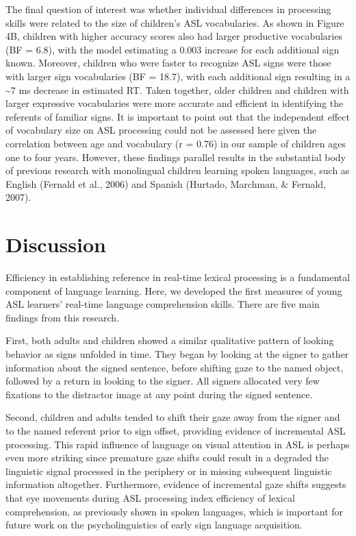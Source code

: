 \documentclass[oneside]{report}
\begin{document}
The final question of interest was whether individual differences in
processing skills were related to the size of children's ASL
vocabularies. As shown in Figure 4B, children with higher accuracy
scores also had larger productive vocabularies (BF = 6.8), with the
model estimating a 0.003 increase for each additional sign known.
Moreover, children who were faster to recognize ASL signs were those
with larger sign vocabularies (BF = 18.7), with each additional sign
resulting in a \textasciitilde{}7 ms decrease in estimated RT. Taken
together, older children and children with larger expressive
vocabularies were more accurate and efficient in identifying the
referents of familiar signs. It is important to point out that the
independent effect of vocabulary size on ASL processing could not be
assessed here given the correlation between age and vocabulary (r =
0.76) in our sample of children ages one to four years. However, these
findings parallel results in the substantial body of previous research
with monolingual children learning spoken languages, such as English
(Fernald et al., 2006) and Spanish (Hurtado, Marchman, \& Fernald,
2007).

\hypertarget{discussion}{%
\section{Discussion}\label{discussion}}

Efficiency in establishing reference in real-time lexical processing is
a fundamental component of language learning. Here, we developed the
first measures of young ASL learners' real-time language comprehension
skills. There are five main findings from this research.

First, both adults and children showed a similar qualitative pattern of
looking behavior as signs unfolded in time. They began by looking at the
signer to gather information about the signed sentence, before shifting
gaze to the named object, followed by a return in looking to the signer.
All signers allocated very few fixations to the distractor image at any
point during the signed sentence.

Second, children and adults tended to shift their gaze away from the
signer and to the named referent prior to sign offset, providing
evidence of incremental ASL processing. This rapid influence of language
on visual attention in ASL is perhaps even more striking since premature
gaze shifts could result in a degraded the linguistic signal processed
in the periphery or in missing subsequent linguistic information
altogether. Furthermore, evidence of incremental gaze shifts suggests
that eye movements during ASL processing index efficiency of lexical
comprehension, as previously shown in spoken languages, which is
important for future work on the psycholinguistics of early sign
language acquisition.
\end{document}
